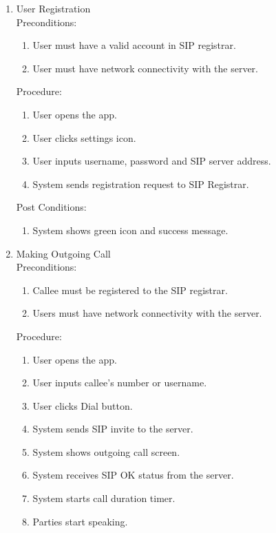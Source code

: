 \begin{enumerate}
 \item User Registration
 \\ Preconditions:
 \begin{enumerate}
  \item User must have a valid account in SIP registrar.
  \item User must have network connectivity with the server.
 \end{enumerate}

 Procedure:
 \begin{enumerate}
  \item User opens the app.
  \item User clicks settings icon.
  \item User inputs username, password and SIP server address.
  \item System sends registration request to SIP Registrar.
 \end{enumerate}

 Post Conditions:
 \begin{enumerate}
  \item System shows green icon and success message.
 \end{enumerate}


 \item Making Outgoing Call
 \\ Preconditions:
 \begin{enumerate}
  \item Callee must be registered to the SIP registrar.
  \item Users must have network connectivity with the server.
 \end{enumerate}

 Procedure:
 \begin{enumerate}
  \item User opens the app.
  \item User inputs callee's number or username.
  \item User clicks Dial button.
  \item System sends SIP invite to the server.
  \item System shows outgoing call screen.
  \item System receives SIP OK status from the server.
  \item System starts call duration timer.
  \item Parties start speaking.
 \end{enumerate}


\end{enumerate}
